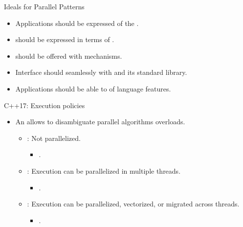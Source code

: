 \begin{frame}[t]{Ideals for Parallel Patterns}
\begin{itemize}[<+->]
  \item Applications should be expressed  of the
        .
  \vfill
  \item {} should be expressed in terms of 
        .
  \vfill
  \item {} should be offered with 
        mechanisms.
  \vfill
  \item Interface should  seamlessly with  and
        its standard library.
  \vfill
  \item Applications should be able to  of  language features.
\end{itemize}
\end{frame}

\begin{frame}[t]{C++17: Execution policies}
\begin{itemize}
  \item An  allows to disambiguate 
        parallel algorithms overloads.
    \begin{itemize}
      \vfill
      \item {}: 
            Not parallelized.
        \begin{itemize}
          \item {}.
        \end{itemize}

      \vfill
      \item {}: 
            Execution can be parallelized in multiple threads.
        \begin{itemize}
          \item {}.
        \end{itemize}

      \vfill
      \item {}:
            Execution can be parallelized, vectorized, or migrated across threads.
        \begin{itemize}
          \item {}.
        \end{itemize}
    \end{itemize}
\end{itemize}
\end{frame}

